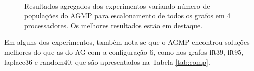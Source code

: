 \documentclass[fleqn,10pt]{SelfArx} %
\begin{document}
\begin{figure}
  \centering
   \\
  \caption{Resultados agregados dos experimentos variando número de populações do AGMP para escalonamento de todos os grafos em 4 processadores. Os melhores resultados estão em destaque.}
  \label{fig:results2}
\end{figure}


Em alguns dos experimentos, também nota-se que o AGMP encontrou soluções melhores do que as do AG com a configuração 6, como nos grafos fft39, fft95, laplace36 e random40, que são apresentados na Tabela \ref{tab:comp}. 
\end{document}
